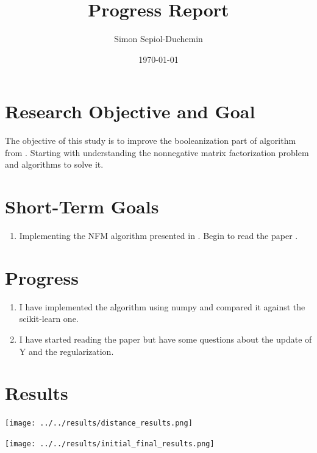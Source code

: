 \documentclass[a4paper,11pt]{article}
\title{Progress Report}
\author{Simon Sepiol-Duchemin}
\date{\today}
\begin{document}
%
\maketitle
\thispagestyle{empty}
%
\section{Research Objective and Goal}
The objective of this study is to improve the booleanization part of algorithm from \cite{9521203}. Starting with understanding the nonnegative matrix factorization problem and algorithms to solve it.
\section{Short-Term Goals}
\begin{enumerate}
\item Implementing the NFM algorithm presented in \cite{9521203}. Begin to read the paper \cite{9521203}.
\end{enumerate}
\section{Progress}
\begin{enumerate}
\item I have implemented the algorithm using numpy and compared it against the scikit-learn one.
\item I have started reading the paper but have some questions about the update of Y and the regularization. 
\end{enumerate}

\section{Results}

    \begin{minipage}{0.45\textwidth}
        \centering
        \texttt{[image: ../../results/distance\_results.png]}
    \end{minipage}\hfill
    \begin{minipage}{0.45\textwidth}
        \centering
        \texttt{[image: ../../results/initial\_final\_results.png]}
    \end{minipage}
    
\end{document}

